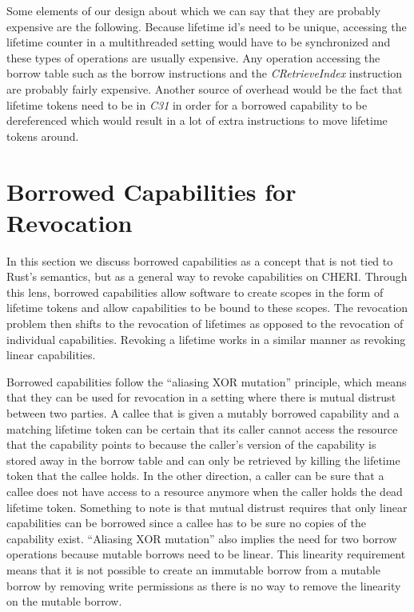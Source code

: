 Some elements of our design about which we can say that they are probably expensive are the following.
Because lifetime id's need to be unique, accessing the lifetime counter in a multithreaded setting would have to be synchronized and these types of operations are usually expensive.
Any operation accessing the borrow table such as the borrow instructions and the \textit{CRetrieveIndex} instruction are probably fairly expensive.
Another source of overhead would be the fact that lifetime tokens need to be in \textit{C31} in order for a borrowed capability to be dereferenced which would result in a lot of extra instructions to move lifetime tokens around.

\section{Borrowed Capabilities for Revocation}
In this section we discuss borrowed capabilities as a concept that is not tied to Rust's semantics, but as a general way to revoke capabilities on CHERI.
Through this lens, borrowed capabilities allow software to create scopes in the form of lifetime tokens and allow capabilities to be bound to these scopes.
The revocation problem then shifts to the revocation of lifetimes as opposed to the revocation of individual capabilities.
Revoking a lifetime works in a similar manner as revoking linear capabilities.

Borrowed capabilities follow the ``aliasing XOR mutation'' principle, which means that they can be used for revocation in a setting where there is mutual distrust between two parties.
A callee that is given a mutably borrowed capability and a matching lifetime token can be certain that its caller cannot access the resource that the capability points to because the caller's version of the capability is stored away in the borrow table and can only be retrieved by killing the lifetime token that the callee holds.
In the other direction, a caller can be sure that a callee does not have access to a resource anymore when the caller holds the dead lifetime token.
Something to note is that mutual distrust requires that only linear capabilities can be borrowed since a callee has to be sure no copies of the capability exist.
``Aliasing XOR mutation'' also implies the need for two borrow operations because mutable borrows need to be linear.
This linearity requirement means that it is not possible to create an immutable borrow from a mutable borrow by removing write permissions as there is no way to remove the linearity on the mutable borrow.

